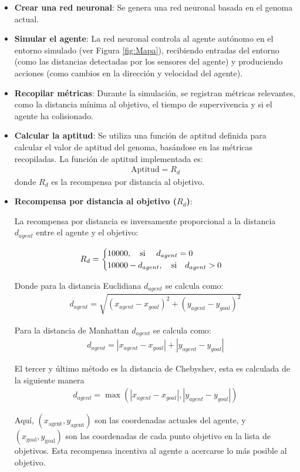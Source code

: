\documentclass[lettersize, journal]{IEEEtran}
\begin{document}
\begin{itemize} 
\item \textbf{Crear una red neuronal}: Se genera una red neuronal basada en el genoma actual. 
\item \textbf{Simular el agente}: La red neuronal controla al agente autónomo en el entorno simulado (ver Figura \ref{fig:Mapa}), recibiendo entradas del entorno (como las distancias detectadas por los sensores del agente) y produciendo acciones (como cambios en la dirección y velocidad del agente). 
\item \textbf{Recopilar métricas}: Durante la simulación, se registran métricas relevantes, como la distancia mínima al objetivo, el tiempo de supervivencia y si el agente ha colisionado. 
\item \textbf{Calcular la aptitud}: Se utiliza una función de aptitud definida para calcular el valor de aptitud del genoma, basándose en las métricas recopiladas. 
La función de aptitud implementada es:
\begin{align*} 
    \text{Aptitud} = R_d
\end{align*}
donde $R_d$ es la recompensa por distancia al objetivo. 

\item \textbf{Recompensa por distancia al objetivo ($R_d$)}:

La recompensa por distancia es inversamente proporcional a la distancia $d_{agent}$ entre el agente y el objetivo:

\begin{align*} 
R_d = \begin{cases} 
10000, \quad \text{si } \quad d_{agent} = 0 
\cr 10000-d_{agent}, \quad \text{si} \quad d_{agent} > 0 
\end{cases} 
\end{align*}

Donde para la distancia Euclidiana $d_{agent}$ se calcula como:
\begin{align*} 
    d_{agent} = {\sqrt{(x_{agent} - x_{goal})^2 + (y_{agent} - y_{goal})^2}} 
\end{align*}

Para la distancia de Manhattan $d_{agent}$ se calcula como:
\begin{align*} 
    d_{agent} = |x_{agent} - x_{goal}| + |y_{agent} - y_{goal}|
\end{align*}

El tercer y último método es la distancia de Chebyshev, esta es calculada de la siguiente manera 
\begin{align*} 
    d_{agent} = \max(|x_{agent} - x_{goal}|, |y_{agent} - y_{goal}|)
\end{align*}



Aquí, $(x_{\text{agent}}, y_{\text{agent}})$ son las coordenadas actuales del agente, y $(x_{\text{goal}}, y_{\text{goal}})$ son las coordenadas de cada punto objetivo en la lista de objetivos. Esta recompensa incentiva al agente a acercarse lo más posible al objetivo.\\
\end{itemize}
\end{document}
